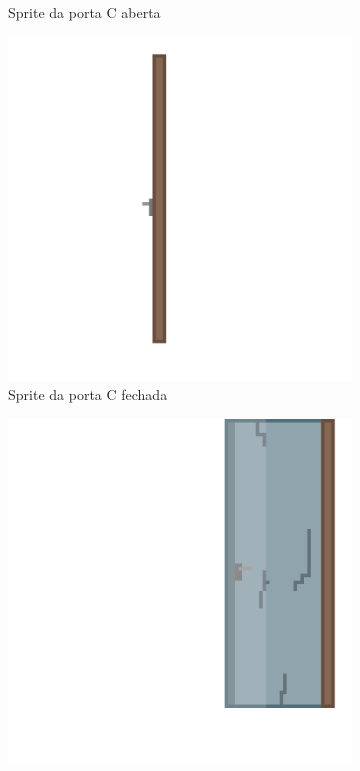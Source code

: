 \begin{figure}[htbp]
\begin{subfigure}{0.18\linewidth}
        \caption{\small Sprite da porta C aberta}
        \label{fig:viduPortaC1}
    \end{subfigure}
    \begin{subfigure}{0.18\linewidth}
        \centering
        \includegraphics[width=1\linewidth]{figs/vidu/referencia_porta_tutorial (2).png}
        \caption{\small Sprite da porta C fechada}
        \label{fig:viduPortaC2}
    \end{subfigure}
    \begin{subfigure}{0.18\linewidth}
        \centering
        \includegraphics[width=1\linewidth]{figs/vidu/referencia_porta_tutorial (3).png}

\end{subfigure}
\end{figure}
